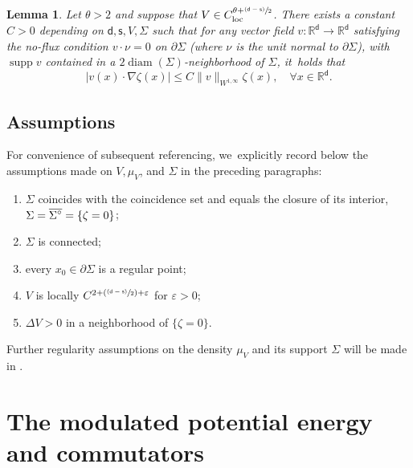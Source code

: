 \documentclass[JEP,XML,SOM,Unicode,published]{cedram}
\let\epsilon\varepsilon
\newcommand{\Ppsfrac}[2]{(\psfrac{#1}{#2})}
\newcommand{\psfrac}[2]{\sfrac{(#1)}{#2}}
\newcommand{\loc}{\textup{loc}}
\newcommand{\olSigmacirc}{\overline{\Sigma^{\raisebox{1pt}{$\scriptstyle\circ$}}}}
\theoremstyle{plain}
\newtheorem{lemma}[thm]{Lemma}
\theoremstyle{definition}
\DeclareMathOperator{\supp}{supp}
\DeclareMathOperator{\diam}{diam}
\newcommand{\R}{{\mathbb{R}}}
\let\p\partial
\renewcommand{\d}{\mathsf{d}}
\newcommand{\s}{\mathsf{s}}
\begin{document}
\begin{lemma}\label{lem:ugradVext}
Let $\theta>2$ and suppose that $V\in C_{\loc}^{\theta+\psfrac{\d-\s}{2}}$. There exists a constant $C>0$ depending on $\d,\s,V,\Sigma$ such that for any vector field $v:\R^\d\to\R^\d$ {satisfying the no-flux condition $v\cdot \nu =0 $ on $\partial \Sigma$ (where $\nu$ is the unit normal to $\partial \Sigma$)}, with $\supp v$ contained in a $2\diam(\Sigma)$-neighborhood of $\Sigma$, it~holds that
\begin{equation}\label{eq:ugradzeta}
\left|v(x)\cdot\nabla\zeta(x)\right| \leq C\|v\|_{W^{1,\infty}}\zeta(x), \quad \forall x\in\R^\d.
\end{equation}
\end{lemma}

\subsection{Assumptions}\label{ssec:EMOPassmp}
For convenience of subsequent referencing, we~explicitly record below the assumptions made on $V,\mu_V$, and $\Sigma$ in the preceding paragraphs:
\begin{enumerate}\renewcommand{\theenumi}{\textup{H}\arabic{enumi}}
\item\label{assSigeq} $\Sigma$ coincides with the coincidence set and equals the closure of its interior, \ie $\Sigma=\olSigmacirc=\{\zeta=0\}$;
\item\label{assSigcon} $\Sigma$ is connected;
\item\label{assSigrp} every $x_0\in \p\Sigma$ is a regular point;
\item\label{assVreg} $V$ is locally $C^{2+\Ppsfrac{\d-\s}{2}+\epsilon}$ for $\epsilon>0$;
\item\label{assVLapl} $\Delta V>0$ in a neighborhood of $\{\zeta =0\}$.
\end{enumerate}
Further regularity assumptions on the density $\mu_V$ and its support $\Sigma$ will be made in .

\section{The modulated potential energy and commutators}\label{sec:ME}
\end{document}
